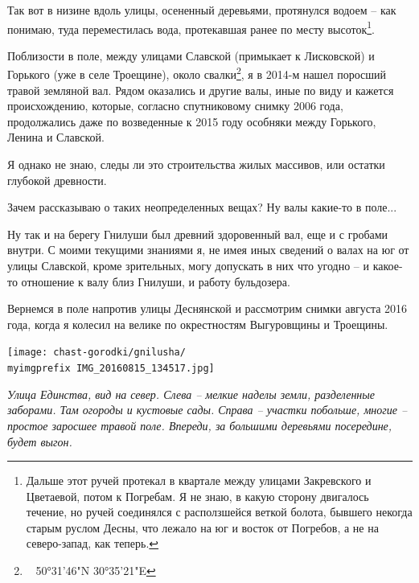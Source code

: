 Так вот в низине вдоль улицы, осененный деревьями, протянулся водоем – как понимаю, туда переместилась вода, протекавшая ранее по месту высоток\footnote{Дальше этот ручей протекал в квартале между улицами Закревского и Цветаевой, потом к Погребам. Я не знаю, в какую сторону двигалось течение, но ручей соединялся с расползшейся веткой болота, бывшего некогда старым руслом Десны, что лежало на юг и восток от Погребов, а не на северо-запад, как теперь.}. 

Поблизости в поле, между улицами Славской (примыкает к Лисковской) и Горького (уже в селе Троещине), около свалки\footnote{~ 50°31'46"N 30°35'21"E}, я в 2014-м нашел поросший травой земляной вал. Рядом оказались и другие валы, иные по виду и кажется происхождению, которые, согласно спутниковому снимку 2006 года, продолжались даже по возведенные к 2015 году особняки между Горького, Ленина и Славской. 

Я однако не знаю, следы ли это строительства жилых массивов, или остатки глубокой древности.

Зачем рассказываю о таких неопределенных вещах? Ну валы какие-то в поле... 

Ну так и на берегу Гнилуши был древний здоровенный вал, еще и с гробами внутри. С моими текущими знаниями я, не имея иных сведений о валах на юг от улицы Славской, кроме зрительных, могу допускать в них что угодно – и какое-то отношение к валу близ Гнилуши, и работу бульдозера.

Вернемся в поле напротив улицы Деснянской и рассмотрим снимки августа 2016 года, когда я колесил на велике по окрестностям Выгуровщины и Троещины.



\vspace*{\fill}
\begin{center}
\texttt{[image: chast-gorodki/gnilusha/\\myimgprefix IMG\_20160815\_134517.jpg]}

\textit{Улица Единства, вид на север. Слева – мелкие наделы земли, разделенные заборами. Там огороды и кустовые сады. Справа – участки побольше, многие – простое заросшее травой поле. Впереди, за большими деревьями посередине, будет выгон.}
\end{center}

